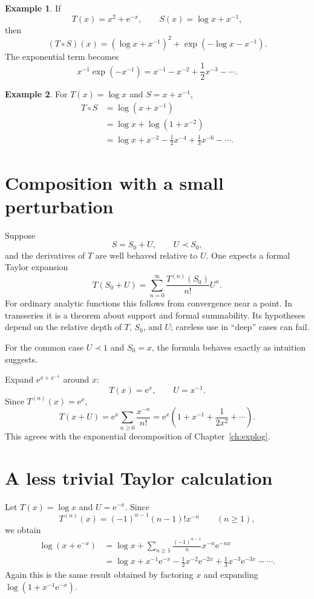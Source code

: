 \documentclass[11pt,openany]{book}
\theoremstyle{definition}
\newtheorem{example}{Example}[chapter]
\theoremstyle{plain}
\theoremstyle{remark}
\newcommand{\e}{\mathrm{e}}
\newcommand{\precdom}{\prec}
\begin{document}
\begin{example}
If
\[
 T(x)=x^2+\e^{-x},
 \qquad
 S(x)=\log x+x^{-1},
\]
then
\[
 (T\circ S)(x)=(\log x+x^{-1})^2
 +\exp(-\log x-x^{-1}).
\]
The exponential term becomes
\[
 x^{-1}\exp(-x^{-1})
 =x^{-1}-x^{-2}+\frac12x^{-3}-\cdots.
\]
\end{example}

\begin{example}
For $T(x)=\log x$ and $S=x+x^{-1}$,
\begin{align*}
 T\circ S
 &=\log(x+x^{-1})\\
 &=\log x+\log(1+x^{-2})\\
 &=\log x+x^{-2}-\frac12x^{-4}
 +\frac13x^{-6}-\cdots.
\end{align*}
\end{example}

\section{Composition with a small perturbation}

Suppose
\[
 S=S_0+U,
 \qquad U\precdom S_0,
\]
and the derivatives of $T$ are well behaved relative to $U$. One expects a formal Taylor expansion
\begin{equation}\label{eq:formal-taylor}
 T(S_0+U)
 =\sum_{n=0}^{\infty}\frac{T^{(n)}(S_0)}{n!}U^n.
\end{equation}
For ordinary analytic functions this follows from convergence near a point. In transseries it is a theorem about support and formal summability. Its hypotheses depend on the relative depth of $T$, $S_0$, and $U$; careless use in ``deep'' cases can fail.

For the common case $U\precdom1$ and $S_0=x$, the formula behaves exactly as intuition suggests.

\begin{workedbox}
Expand $\e^{x+x^{-1}}$ around $x$:
\[
 T(x)=\e^x,
 \qquad U=x^{-1}.
\]
Since $T^{(n)}(x)=\e^x$,
\[
 T(x+U)=\e^x\sum_{n\ge0}\frac{x^{-n}}{n!}
 =\e^x\left(1+x^{-1}+\frac1{2x^2}+\cdots\right).
\]
This agrees with the exponential decomposition of Chapter~\ref{ch:explog}.
\end{workedbox}

\section{A less trivial Taylor calculation}

Let $T(x)=\log x$ and $U=\e^{-x}$. Since
\[
 T^{(n)}(x)=(-1)^{n-1}(n-1)!x^{-n}
 \qquad(n\ge1),
\]
we obtain
\begin{align*}
 \log(x+\e^{-x})
 &=\log x+
 \sum_{n\ge1}\frac{(-1)^{n-1}}n
 x^{-n}\e^{-nx}\\
 &=\log x+x^{-1}\e^{-x}
 -\frac12x^{-2}\e^{-2x}
 +\frac13x^{-3}\e^{-3x}-\cdots.
\end{align*}
Again this is the same result obtained by factoring $x$ and expanding $\log(1+x^{-1}\e^{-x})$.
\end{document}
